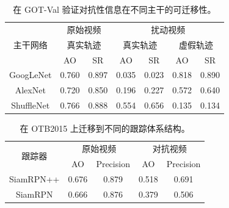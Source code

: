 \begin{table}[t]
\centering
\caption{在 GOT-Val 验证对抗性信息在不同主干的可迁移性。}
\begin{tabular}{c cc cc cc} 
\toprule
\multirow{3}{*}[-6pt]{主干网络} & \multicolumn{2}{c}{原始视频}    & \multicolumn{4}{c}{扰动视频}                                        \\ 
\cmidrule(lr){2-3} \cmidrule(lr){4-7}
                          & \multicolumn{2}{c}{真实轨迹} & \multicolumn{2}{c}{真实轨迹} & \multicolumn{2}{c}{虚假轨迹}  \\ 
\cmidrule(lr){2-3} \cmidrule(lr){4-7}
                          & AO    & SR                           & AO    & SR                           & AO    & SR                           \\ 
\midrule
GoogLeNet                 & 0.760 & 0.897                        & 0.035 & 0.023                        & 0.818 & 0.890                        \\
AlexNet                   & 0.720 & 0.850                        & 0.196 & 0.227                        & 0.572 & 0.640                        \\
ShuffleNet                & 0.766 & 0.888                        & 0.554 & 0.656                        & 0.135 & 0.134                        \\
\bottomrule
\end{tabular}
\label{tab:backbone}
\end{table}

\begin{table}[t]
\caption{在 OTB2015 上迁移到不同的跟踪体系结构。}
\centering
\begin{tabular}{ccccc} 
\toprule
\multirow{2}{*}[-2pt]{跟踪器} & \multicolumn{2}{c}{原始视频} & \multicolumn{2}{c}{对抗视频}  \\
\cmidrule(lr){2-3} \cmidrule(lr){4-5}
                          & AO & Precision              & AO & Precision                   \\
\midrule
SiamRPN++                 & 0.676   & 0.879                  & 0.518   & 0.691                       \\
SiamRPN                   & 0.666   & 0.876                  & 0.379   & 0.506                       \\
\bottomrule
\end{tabular}
\label{tab:arch}
\end{table}

